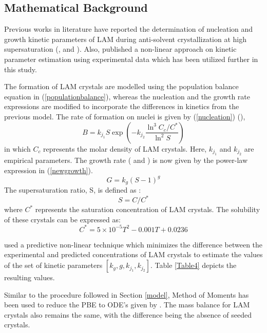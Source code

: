 \documentclass[3p,times,authoryear]{elsarticle}
\begin{document}
\subsection{Mathematical Background}

Previous works in literature have reported the determination of nucleation and growth kinetic parameters of LAM during anti-solvent crystallization at high supersaturation (\cite{lindenberg}, \cite{mahajan1994nucleation} and \cite{zarkadas2006antisolvent}). Also, \cite{bhoi} published a non-linear approach on kinetic parameter estimation using experimental data which has been utilized further in this study.
\par
The formation of LAM crystals are modelled using the population balance equation in (\ref{populationbalance}), whereas the nucleation and the growth rate expressions are modified to incorporate the differences in kinetics from the previous model. The rate of formation on nuclei is given by (\ref{nucleation}) (\cite{lindenberg}), 
\begin{equation}
B = k_{j_{1}}S\exp\left( -k_{j_{2}}\frac{\ln^{3}{C_{c}/C^{*}}}{\ln^{2}S}\right) \label{nucleation}
\end{equation}
in which $C_{c}$ represents the  molar density of LAM crystals. Here, $k_{j_{1}}$ and $k_{j_{2}}$ are empirical parameters. The growth rate (\cite{nagy} and \cite{nagy2}) is now given by the power-law expression in (\ref{newgrowth}). 
\begin{equation}
G = k_{g}(S-1)^{g} \label{newgrowth}
\end{equation}
The supersaturation ratio, S, is defined as :
\begin{equation}
S = C/C^{*}
\end{equation}
where $C^{*}$ represents the saturation concentration of LAM crystals. The solubility of these crystals can be expressed as:
\begin{equation}
C^{*} = 5 \times 10^{-5}T^{2} - 0.001T + 0.0236
\end{equation}

\cite{bhoi} used a predictive non-linear technique which minimizes the difference between the experimental and predicted concentrations of LAM crystals to estimate the values of the set of kinetic parameters $[k_{g}, g, k_{j_{1}}, k_{j_{2}}]$. Table \ref{Table4} depicts the resulting values. 
\par
Similar to the procedure followed in Section \ref{model}, Method of Moments has been used to reduce the PBE to ODE's given by . The mass balance for LAM crystals also remains the same, with the difference being the absence of seeded crystals.\\
\end{document}
